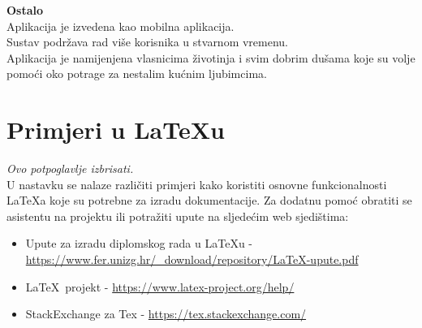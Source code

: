 		\textbf{Ostalo}\\
		Aplikacija je izvedena kao mobilna aplikacija.\\
		Sustav podržava rad više korisnika u stvarnom vremenu.\\
		Aplikacija je namijenjena vlasnicima životinja i svim dobrim dušama koje su volje pomoći oko potrage za nestalim kućnim ljubimcima.
		
		\eject
		
		\section{Primjeri u \LaTeX u}
		
		\textit{Ovo potpoglavlje izbrisati.}\\

		U nastavku se nalaze različiti primjeri kako koristiti osnovne funkcionalnosti \LaTeX a koje su potrebne za izradu dokumentacije. Za dodatnu pomoć obratiti se asistentu na projektu ili potražiti upute na sljedećim web sjedištima:
		\begin{itemize}
			\item Upute za izradu diplomskog rada u \LaTeX u - \url{https://www.fer.unizg.hr/_download/repository/LaTeX-upute.pdf}
			\item \LaTeX\ projekt - \url{https://www.latex-project.org/help/}
			\item StackExchange za Tex - \url{https://tex.stackexchange.com/}\\
		
		\end{itemize} 	


